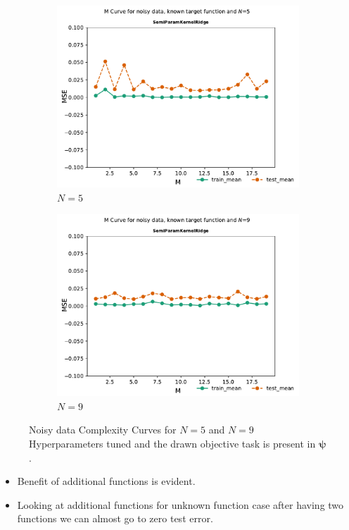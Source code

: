 \documentclass{tran-l}
\theoremstyle{definition}
\theoremstyle{remark}
\numberwithin{equation}{section}
\begin{document}
\begin{figure}[h!]
   \centering
   \begin{subfigure}[b]{0.45\textwidth}
     \centering
     \includegraphics[width=\textwidth]{Figures/knownnoisy/Mcurve5}
     \caption{$N=5$}
   \end{subfigure}
   \hfill
   \begin{subfigure}[b]{0.45\textwidth}
     \centering
     \includegraphics[width=\textwidth]{Figures/knownnoisy/Mcurve9}
     \caption{$N=9$}
   \end{subfigure}
   \caption{Noisy data Complexity Curves for $N=5$ and $N=9$ Hyperparameters tuned and the drawn objective task is present in $\boldsymbol{\psi}$.}
\end{figure}
\begin{itemize}
  \item Benefit of additional functions is evident.
  \item Looking at additional functions for unknown function case after having two functions we can almost go to zero test error. 
\end{itemize}
\end{document}
